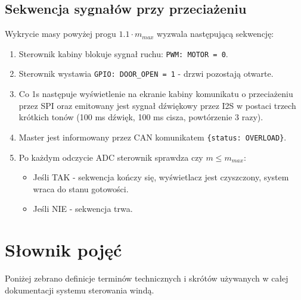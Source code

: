 \documentclass[a4paper,12pt]{article}
\begin{document}
\subsection{Sekwencja sygnałów przy przeciażeniu}
Wykrycie masy powyżej progu $1.1 \cdot m_{max}$ wyzwala następującą sekwencję:
\begin{enumerate}
    \item Sterownik kabiny blokuje sygnał ruchu: \texttt{PWM: MOTOR = 0}.
    \item Sterownik wystawia \texttt{GPIO: DOOR\_OPEN = 1} - drzwi pozostają otwarte.
    \item Co 1s następuje wyświetlenie na ekranie kabiny komunikatu o przeciażeniu przez SPI oraz emitowany jest sygnał dźwiękowy przez I2S w postaci trzech krótkich tonów (100 ms dźwięk, 100 ms cisza, powtórzenie 3 razy).
    \item Master jest informowany przez CAN komunikatem \texttt{\{status: OVERLOAD\}}.
    \item Po każdym odczycie ADC sterownik sprawdza czy $m \leq m_{max}$:
    \begin{itemize}
        \item Jeśli TAK - sekwencja kończy się, wyświetlacz jest czyszczony, system wraca do stanu gotowości.
        \item Jeśli NIE - sekwencja trwa.
    \end{itemize}
\end{enumerate}
\pagebreak
\section{Słownik pojęć}

Poniżej zebrano definicje terminów technicznych i skrótów używanych w całej dokumentacji systemu sterowania windą.
\end{document}
